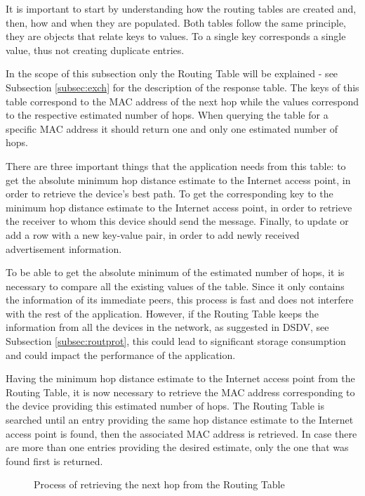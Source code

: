 It is important to start by understanding how the routing tables are created and, then, how and when they are populated. Both tables follow the same principle, they are objects that relate keys to values. To a single key corresponds a single value, thus not creating duplicate entries.

In the scope of this subsection only the Routing Table will be explained - see Subsection \ref{subsec:exch} for the description of the response table. The keys of this table correspond to the \gls{MAC} address of the next hop while the values correspond to the respective estimated number of hops. When querying the table for a specific \gls{MAC} address it should return one and only one estimated number of hops.

There are three important things that the application needs from this table: to get the absolute minimum hop distance estimate to the Internet access point, in order to retrieve the device's best path. To get the corresponding key to the minimum hop distance estimate to the Internet access point, in order to retrieve the receiver to whom this device should send the message. Finally, to update or add a row with a new key-value pair, in order to add newly received advertisement information.

To be able to get the absolute minimum of the estimated number of hops, it is necessary to compare all the existing values of the table. Since it only contains the information of its immediate peers, this process is fast and does not interfere with the rest of the application. However, if the Routing Table keeps the information from all the devices in the network, as suggested in \gls{DSDV}, see Subsection \ref{subsec:routprot}, this could lead to significant storage consumption and could impact the performance of the application.

Having the minimum hop distance estimate to the Internet access point from the Routing Table, it is now necessary to retrieve the \gls{MAC} address corresponding to the device providing this estimated number of hops. The Routing Table is searched until an entry providing the same hop distance estimate to the Internet access point is found, then the associated \gls{MAC} address is retrieved. In case there are more than one entries providing the desired estimate, only the one that was found first is returned.

\begin{figure}[ht]
	\noindent{}
	\caption{\label{fig:nexthoprqt} Process of retrieving the next hop from the Routing Table}
\end{figure}

